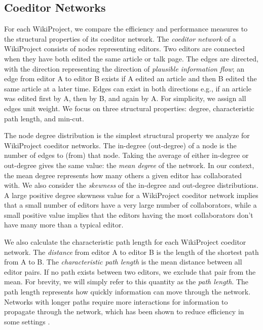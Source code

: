 \documentclass[10pt,twocolumn]{article}
\newcommand{\+}{\phantom{-}}
\begin{document}
\subsection{Coeditor Networks}

For each WikiProject, we compare the efficiency and performance measures to the structural
properties of its coeditor network.
The {\em coeditor network} of a WikiProject consists of nodes representing editors.
Two editors are connected when they have both edited the same article or talk page.
The edges are directed, with the direction representing the direction of
{\em plausible information flow};
an edge from editor A to editor B exists if A edited an article and then B edited the same article at
a later time.
Edges can exist in both directions e.g., if an article was edited first by A, then by B, and again by A.
For simplicity, we assign all edges unit weight.
We focus on three structural properties: degree, characteristic path length, and min-cut.

The node degree distribution is the simplest structural property we analyze for WikiProject
coeditor networks.
The in-degree (out-degree) of a node is the number of edges to (from) that node.
Taking the average of either in-degree or out-degree gives the same value:
the {\em mean degree} of the network.
In our context, the mean degree represents how many others a given editor has collaborated with.
We also consider the {\em skewness} of the in-degree and out-degree distributions.
A large positive degree skewness value for a WikiProject coeditor network
implies that a small number of editors have a very large number of collaborators,
while a small positive value implies that the editors having the most collaborators
don't have many more than a typical editor.

We also calculate the characteristic path length for each WikiProject coeditor network.
The {\em distance} from editor A to editor B is the length of the shortest path from A to B.
The {\em characteristic path length} is the mean distance between all editor pairs.
If no path exists between two editors, we exclude that pair from the mean.
For brevity, we will simply refer to this quantity as the {\em path length}.
The path length represents how quickly information can move through the network.
Networks with longer paths require more interactions for information to propagate through
the network,
which has been shown to reduce efficiency in some settings
\cite{mason_propagation_2008,barkoczi_social_2016}.
\end{document}
